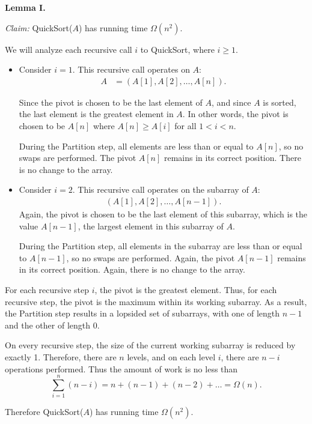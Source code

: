 \begin{enumerate}
\begin{solution}
\textbf{Lemma I. }

\textit{Claim: }{\sc QuickSort}($A$) has running time $\Omega(n^2)$.

We will analyze each recursive call $i$ to {\sc QuickSort}, where $i\geq 1$.
\begin{itemize}
\item Consider $i=1$. This recursive call operates on $A$:
\begin{align*}
A&=(A[1],A[2],\dots,A[n]).
\end{align*}

Since the pivot is chosen to be the last element of $A$, and since $A$ is sorted, the last element is the greatest element in $A$. In other words, the pivot is chosen to be $A[n]$ where $A[n]\geq A[i]$ for all $1<i<n$.

During the {\sc Partition} step, all elements are less than or equal to $A[n]$, so no swaps are performed. The pivot $A[n]$ remains in its correct position. There is no change to the array.

\item Consider $i=2$. This recursive call operates on the subarray of $A$:
\begin{align*}
(A[1],A[2],\dots,A[n-1]).
\end{align*}
Again, the pivot is chosen to be the last element of this subarray, which is the value $A[n-1]$, the largest element in this subarray of $A$.

During the {\sc Partition} step, all elements in the subarray are less than or equal to $A[n-1]$, so no swaps are performed. Again, the pivot $A[n-1]$ remains in its correct position. Again, there is no change to the array.
\end{itemize}

For each recursive step $i$, the pivot is the greatest element. Thus, for each recursive step, the pivot is the maximum within its working subarray. As a result, the {\sc Partition} step results in a lopsided set of subarrays, with one of length $n-1$ and the other of length $0$.

On every recursive step, the size of the current working subarray is reduced by exactly 1. Therefore, there are $n$ levels, and on each level $i$, there are $n-i$ operations performed. Thus the amount of work is no less than
\begin{equation*}
\sum_{i=1}^n(n-i)=n+(n-1)+(n-2)+\dots=\Omega(n).
\end{equation*}

Therefore {\sc QuickSort}($A$) has running time $\Omega(n^2)$.\\


\end{solution}
\end{enumerate}

